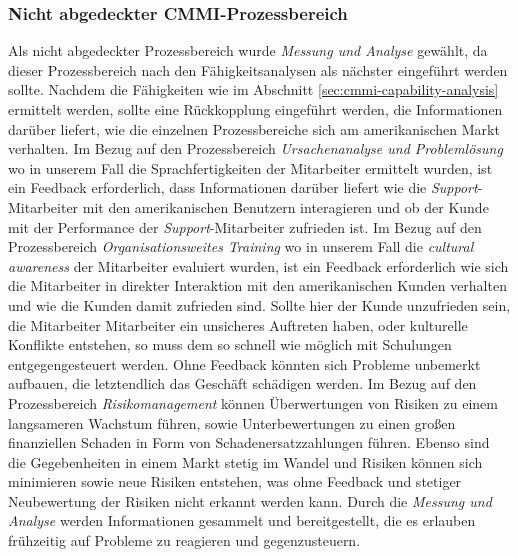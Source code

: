 \subsubsection{Nicht abgedeckter CMMI-Prozessbereich}
Als nicht abgedeckter Prozessbereich wurde \emph{Messung und Analyse} gewählt, da dieser Prozessbereich nach den Fähigkeitsanalysen als nächster eingeführt werden sollte. Nachdem die Fähigkeiten wie im Abschnitt \ref{sec:cmmi-capability-analysis} ermittelt werden, sollte eine Rückkopplung eingeführt werden, die Informationen darüber liefert, wie die einzelnen Prozessbereiche sich am amerikanischen Markt verhalten.
\newline
\newline
Im Bezug auf den Prozessbereich \emph{Ursachenanalyse und Problemlösung} wo in unserem Fall die Sprachfertigkeiten der Mitarbeiter ermittelt wurden, ist ein Feedback erforderlich, dass Informationen darüber liefert wie die \emph{Support}-Mitarbeiter mit den amerikanischen Benutzern interagieren und ob der Kunde mit der Performance der \emph{Support}-Mitarbeiter zufrieden ist.
\newline
\newline
Im Bezug auf den Prozessbereich \emph{Organisationsweites Training} wo in unserem Fall die  \emph{cultural awareness} der Mitarbeiter evaluiert wurden, ist ein Feedback erforderlich wie sich die Mitarbeiter in direkter Interaktion mit den amerikanischen Kunden verhalten und wie die Kunden damit zufrieden sind. Sollte hier der Kunde unzufrieden sein, die Mitarbeiter Mitarbeiter ein unsicheres Auftreten haben, oder kulturelle Konflikte entstehen, so muss dem so schnell wie möglich mit Schulungen entgegengesteuert werden. Ohne Feedback könnten sich Probleme unbemerkt aufbauen, die letztendlich das Geschäft schädigen werden. 
\newline
\newline
Im Bezug auf den Prozessbereich \emph{Risikomanagement} können Überwertungen von Risiken zu einem langsameren Wachstum führen, sowie Unterbewertungen zu einen großen finanziellen Schaden in Form von Schadenersatzzahlungen führen. Ebenso sind die Gegebenheiten in einem Markt stetig im Wandel und Risiken können sich minimieren sowie neue Risiken entstehen, was ohne Feedback und stetiger Neubewertung der Risiken nicht erkannt werden kann. Durch die \emph{Messung und Analyse} werden Informationen gesammelt und bereitgestellt, die es erlauben frühzeitig auf Probleme zu reagieren und gegenzusteuern.


 